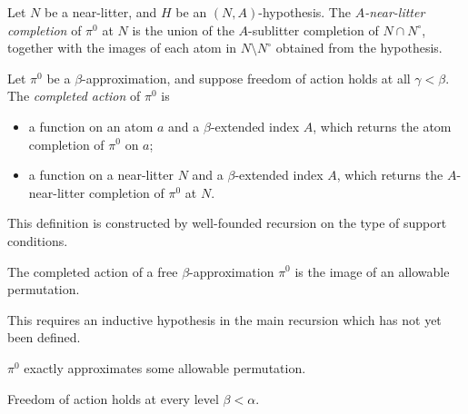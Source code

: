 \documentclass{article}
\begin{document}
\begin{definition}
    Let \( N \) be a near-litter, and \( H \) be an \( (N, A) \)-hypothesis.
    The \emph{\( A \)-near-litter completion} of \( \pi^0 \) at \( N \) is the union of the \( A \)-sublitter completion of \( N \cap N^\circ \), together with the images of each atom in \( N \setminus N^\circ \) obtained from the hypothesis.
\end{definition}
\begin{definition}
    Let \( \pi^0 \) be a \( \beta \)-approximation, and suppose freedom of action holds at all \( \gamma < \beta \).
    The \emph{completed action} of \( \pi^0 \) is
    \begin{itemize}
        \item a function on an atom \( a \) and a \( \beta \)-extended index \( A \), which returns the atom completion of \( \pi^0 \) on \( a \);
        \item a function on a near-litter \( N \) and a \( \beta \)-extended index \( A \), which returns the \( A \)-near-litter completion of \( \pi^0 \) at \( N \).
    \end{itemize}
\end{definition}
\begin{remark}
    This definition is constructed by well-founded recursion on the type of support conditions.
\end{remark}
\begin{lemma}
    The completed action of a free \( \beta \)-approximation \( \pi^0 \) is the image of an allowable permutation.
\end{lemma}
\begin{remark}
    This requires an inductive hypothesis in the main recursion which has not yet been defined.
\end{remark}
\begin{corollary}
    \( \pi^0 \) exactly approximates some allowable permutation.
\end{corollary}
\begin{theorem}
    Freedom of action holds at every level \( \beta < \alpha \).
\end{theorem}
\end{document}
